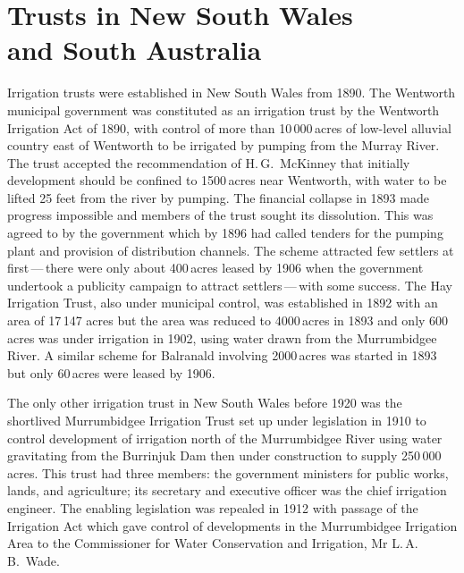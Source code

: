 \section*{Trusts in New South Wales\\ and South Australia}
 

Irrigation trusts were established in New South Wales from 1890.  The
Wentworth municipal government was constituted as an irrigation trust
by the Wentworth Irrigation Act  of 1890, with control of more than 10\,000\,acres of
low-level alluvial country east of Wentworth to be irrigated by
pumping from the Murray River.   The trust
accepted the recommendation of H.\,G.~McKinney that initially
development should be confined to 1500\,acres near Wentworth, with
water to be lifted 25 feet from the river by pumping.  The
financial collapse in 1893 made progress impossible and
members of the trust sought its dissolution.  This was agreed to by
the government which by 1896 had called tenders for the pumping plant
and provision of distribution
channels. The scheme attracted
few settlers at first\,---\,there were only about 400\,acres leased by
1906 when the government undertook a publicity campaign to attract
settlers\,---\,with some success.  The Hay Irrigation Trust,
 also under municipal control, was
established in 1892 with an area of 17\,147 acres but the area was
reduced to 4000\,acres in 1893 and only 600\,acres was under
irrigation in 1902, using water drawn from the Murrumbid\-gee River.
 A similar scheme for Balranald
 involving 2000\,acres was started in 1893 but
only 60\,acres were leased by 1906.

The only other irrigation trust in New South Wales before 1920 was the
shortlived Murrumbidgee Irrigation Trust
 set up under legislation in 1910
to control development of irrigation north of the Murrumbidgee River
 using water gravitating from the Burrinjuk
Dam  then under
construction to supply 250\,000\,acres.  This trust had three members:
the government ministers for public works, lands, and agriculture; its
secretary and executive officer was the chief irrigation engineer.
The enabling legislation was repealed in 1912 with passage of the
Irrigation Act  which gave
control of developments in the Murrumbidgee Irrigation Area to the
Commissioner for Water Conservation and Irrigation, Mr
L.\,A.\,B.~Wade. 

